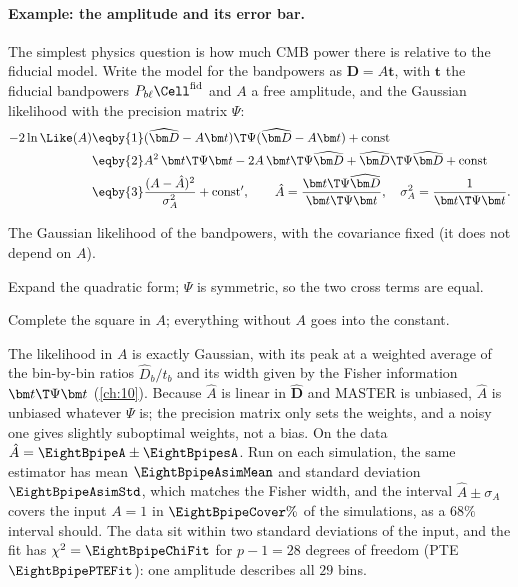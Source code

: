 \paragraph{Example: the amplitude and its error bar.}
The simplest physics question is how much CMB power there is relative to the fiducial model. Write the
model for the bandpowers as $\bm D=A\bm t$, with $\bm t$ the fiducial bandpowers $P_{b\ell}\Cell^{\rm fid}$ and $A$ a free
amplitude, and the Gaussian likelihood with the precision matrix $\Psi$:
\begin{align*}
  -2\ln\Like(A)&\eqby{1}(\widehat{\bm D}-A\bm t)\T\Psi(\widehat{\bm D}-A\bm t)+\text{const}\\
  &\eqby{2}A^2\,\bm t\T\Psi\bm t-2A\,\bm t\T\Psi\widehat{\bm D}+\widehat{\bm D}\T\Psi\widehat{\bm D}+\text{const}\\
  &\eqby{3}\frac{(A-\hat A)^2}{\sigma_A^2}+\text{const}',\qquad
  \hat A=\frac{\bm t\T\Psi\widehat{\bm D}}{\bm t\T\Psi\bm t},\quad \sigma_A^2=\frac1{\bm t\T\Psi\bm t}.
\end{align*}
\begin{explain}
  \item The Gaussian likelihood of the bandpowers, with the covariance fixed (it does not depend on $A$).
  \item Expand the quadratic form; $\Psi$ is symmetric, so the two cross terms are equal.
  \item Complete the square in $A$; everything without $A$ goes into the constant.
\end{explain}
The likelihood in $A$ is exactly Gaussian, with its peak at a weighted average of the bin-by-bin
ratios $\widehat D_b/t_b$ and its width given by the Fisher information $\bm t\T\Psi\bm t$ (\cref{ch:10}).
Because $\hat A$ is linear in $\widehat{\bm D}$ and MASTER is unbiased, $\hat A$ is unbiased whatever $\Psi$ is; the
precision matrix only sets the weights, and a noisy one gives slightly suboptimal weights, not a bias.
On the data $\hat A=\EightBpipeA\pm\EightBpipesA$. Run on each simulation, the same estimator has mean
$\EightBpipeAsimMean$ and standard deviation $\EightBpipeAsimStd$, which matches the Fisher width, and the interval
$\hat A\pm\sigma_A$ covers the input $A=1$ in $\EightBpipeCover\%$ of the simulations, as a $68\%$ interval should. The
data sit within two standard deviations of the input, and the fit has $\chi^2=\EightBpipeChiFit$ for $p-1=28$ degrees of
freedom (PTE $\EightBpipePTEFit$): one amplitude describes all $29$ bins.

